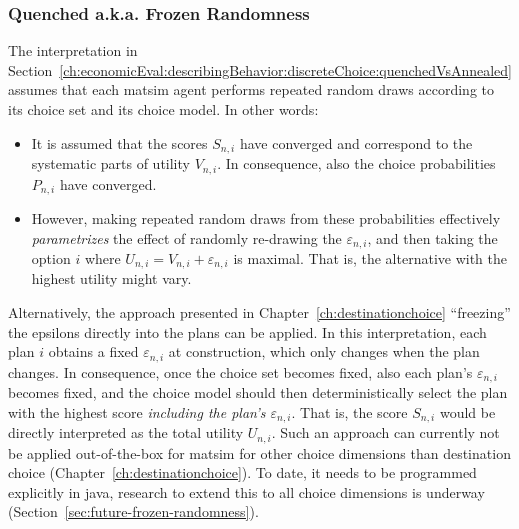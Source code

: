 \begin{oframed}
%
%
\subsubsection{Quenched a.k.a. Frozen Randomness}
\label{sec:frozen-randomness}
%
%
The interpretation in Section~\ref{ch:economicEval:describingBehavior:discreteChoice:quenchedVsAnnealed} assumes that each \acrshort{matsim} agent performs repeated random draws according to its choice set and its choice model. 
%
In other words:
%
\begin{itemize}\styleItemize
\item It is assumed that the scores $S_{n,i}$ have converged and correspond to the systematic parts of utility $V_{n,i}$. In consequence, also the choice probabilities $P_{n,i}$ have converged.
%
\item However, making repeated random draws from these probabilities effectively \emph{parametrizes} the effect of randomly re-drawing the $\varepsilon_{n,i}$, and then taking the option $i$ where $U_{n,i} = V_{n,i} + \varepsilon_{n,i}$ is maximal. That is, the alternative with the highest utility might vary.
\end{itemize}
%

Alternatively, the approach presented in Chapter~\ref{ch:destinationchoice} ``freezing'' the epsilons directly into the plans can be applied.  
In this interpretation, each plan $i$ obtains a fixed $\varepsilon_{n,i}$ at construction, which only changes when the plan changes. 
In consequence, once the choice set becomes fixed, also each plan's $\varepsilon_{n,i}$ becomes fixed, and the choice model should then deterministically select the plan with the highest score \emph{including the plan's $\varepsilon_{n,i}$}.
%
That is, the score $S_{n,i}$ would be directly interpreted as the total utility $U_{n,i}$.
%
Such an approach can currently not be applied out-of-the-box for \acrshort{matsim} for other choice dimensions than destination choice (Chapter~\ref{ch:destinationchoice}).
To date, it needs to be programmed explicitly in \gls{java}, research to extend this to all choice dimensions is underway (Section~\ref{sec:future-frozen-randomness}). 


\end{oframed}
